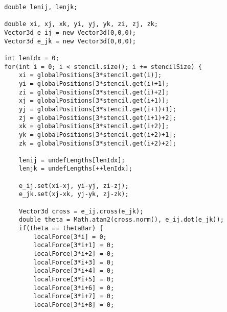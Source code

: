 \begin{lstlisting}
		double lenij, lenjk;
		
		double xi, xj, xk, yi, yj, yk, zi, zj, zk;
		Vector3d e_ij = new Vector3d(0,0,0);
		Vector3d e_jk = new Vector3d(0,0,0);
		
		int lenIdx = 0;
		for(int i = 0; i < stencil.size(); i += stencilSize) {
			xi = globalPositions[3*stencil.get(i)];
			yi = globalPositions[3*stencil.get(i)+1];
			zi = globalPositions[3*stencil.get(i)+2];
			xj = globalPositions[3*stencil.get(i+1)];
			yj = globalPositions[3*stencil.get(i+1)+1];
			zj = globalPositions[3*stencil.get(i+1)+2];
			xk = globalPositions[3*stencil.get(i+2)];
			yk = globalPositions[3*stencil.get(i+2)+1];
			zk = globalPositions[3*stencil.get(i+2)+2];
			
			lenij = undefLengths[lenIdx];
			lenjk = undefLengths[++lenIdx];
			
			e_ij.set(xi-xj, yi-yj, zi-zj);
			e_jk.set(xj-xk, yj-yk, zj-zk);
			
			Vector3d cross = e_ij.cross(e_jk);
			double theta = Math.atan2(cross.norm(), e_ij.dot(e_jk));
			if(theta == thetaBar) {
				localForce[3*i] = 0;
				localForce[3*i+1] = 0;
				localForce[3*i+2] = 0;
				localForce[3*i+3] = 0;
				localForce[3*i+4] = 0;
				localForce[3*i+5] = 0;
				localForce[3*i+6] = 0;
				localForce[3*i+7] = 0;
				localForce[3*i+8] = 0;
				

\end{lstlisting}
